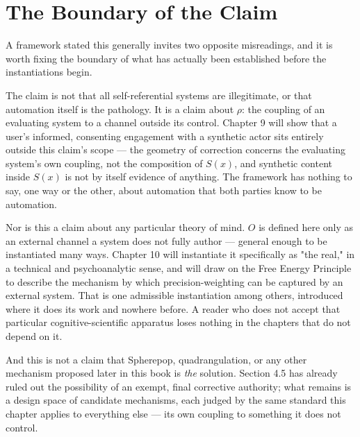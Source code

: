 \documentclass[12pt,a4paper]{book}
\begin{document}
\section{The Boundary of the Claim}

A framework stated this generally invites two opposite misreadings, and it is worth fixing the boundary of what has actually been established before the instantiations begin.

The claim is not that all self-referential systems are illegitimate, or that automation itself is the pathology. It is a claim about $\rho$: the coupling of an evaluating system to a channel outside its control. Chapter 9 will show that a user's informed, consenting engagement with a synthetic actor sits entirely outside this claim's scope — the geometry of correction concerns the evaluating system's own coupling, not the composition of $S(x)$, and synthetic content inside $S(x)$ is not by itself evidence of anything. The framework has nothing to say, one way or the other, about automation that both parties know to be automation.

Nor is this a claim about any particular theory of mind. $O$ is defined here only as an external channel a system does not fully author — general enough to be instantiated many ways. Chapter 10 will instantiate it specifically as "the real," in a technical and psychoanalytic sense, and will draw on the Free Energy Principle to describe the mechanism by which precision-weighting can be captured by an external system. That is one admissible instantiation among others, introduced where it does its work and nowhere before. A reader who does not accept that particular cognitive-scientific apparatus loses nothing in the chapters that do not depend on it.

And this is not a claim that Spherepop, quadrangulation, or any other mechanism proposed later in this book is \emph{the} solution. Section 4.5 has already ruled out the possibility of an exempt, final corrective authority; what remains is a design space of candidate mechanisms, each judged by the same standard this chapter applies to everything else — its own coupling to something it does not control.
\end{document}
